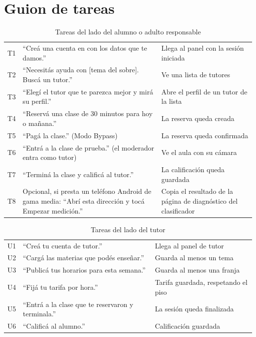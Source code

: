 \section{Guion de tareas}

\begin{table}[H]
    \centering
    \caption{Tareas del lado del alumno o adulto responsable}
    \label{tab:tareas-alumno}
    \small
    \begin{tabularx}{\textwidth}{l L L}
        \toprule
        \tb{\#} &  &  \\
        \midrule
        T1 & ``Creá una cuenta en \sistema{} con los datos que te damos.'' & Llega al panel con la sesión iniciada \\
        T2 & ``Necesitás ayuda con [tema del sobre]. Buscá un tutor.'' & Ve una lista de tutores \\
        T3 & ``Elegí el tutor que te parezca mejor y mirá su perfil.'' & Abre el perfil de un tutor de la lista \\
        T4 & ``Reservá una clase de 30 minutos para hoy o mañana.'' & La reserva queda creada \\
        T5 & ``Pagá la clase.'' (Modo Bypass) & La reserva queda confirmada \\
        T6 & ``Entrá a la clase de prueba.'' (el moderador entra como tutor) & Ve el aula con su cámara \\
        T7 & ``Terminá la clase y calificá al tutor.'' & La calificación queda guardada \\
        T8 & Opcional, si presta un teléfono Android de gama media: ``Abrí esta dirección y tocá Empezar medición.'' & Copia el resultado de la página de diagnóstico del clasificador \\
        \bottomrule
    \end{tabularx}
\end{table}

\begin{table}[H]
    \centering
    \caption{Tareas del lado del tutor}
    \label{tab:tareas-tutor}
    \small
    \begin{tabularx}{\textwidth}{l L L}
        \toprule
        \tb{\#} &  &  \\
        \midrule
        U1 & ``Creá tu cuenta de tutor.'' & Llega al panel de tutor \\
        U2 & ``Cargá las materias que podés enseñar.'' & Guarda al menos un tema \\
        U3 & ``Publicá tus horarios para esta semana.'' & Guarda al menos una franja \\
        U4 & ``Fijá tu tarifa por hora.'' & Tarifa guardada, respetando el piso \\
        U5 & ``Entrá a la clase que te reservaron y terminala.'' & La sesión queda finalizada \\
        U6 & ``Calificá al alumno.'' & Calificación guardada \\
        \bottomrule
    \end{tabularx}
\end{table}

